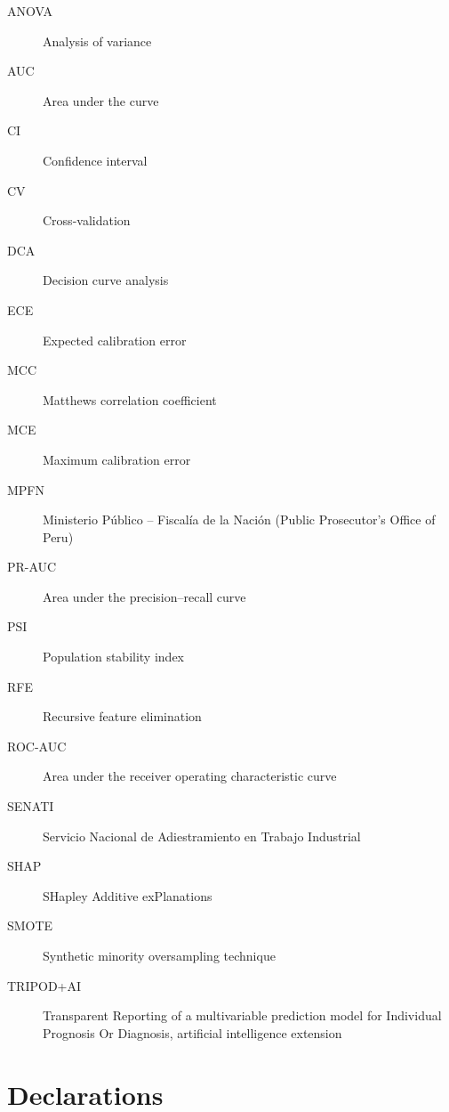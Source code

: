 \documentclass[sn-vancouver,Numbered]{sn-jnl}
\begin{document}
\begin{description}
\item[ANOVA] Analysis of variance
\item[AUC] Area under the curve
\item[CI] Confidence interval
\item[CV] Cross-validation
\item[DCA] Decision curve analysis
\item[ECE] Expected calibration error
\item[MCC] Matthews correlation coefficient
\item[MCE] Maximum calibration error
\item[MPFN] Ministerio P\'ublico -- Fiscal\'ia de la Naci\'on (Public Prosecutor's Office of Peru)
\item[PR-AUC] Area under the precision--recall curve
\item[PSI] Population stability index
\item[RFE] Recursive feature elimination
\item[ROC-AUC] Area under the receiver operating characteristic curve
\item[SENATI] Servicio Nacional de Adiestramiento en Trabajo Industrial
\item[SHAP] SHapley Additive exPlanations
\item[SMOTE] Synthetic minority oversampling technique
\item[TRIPOD+AI] Transparent Reporting of a multivariable prediction model for Individual Prognosis Or Diagnosis, artificial intelligence extension
\end{description}

\section*{Declarations}
\end{document}
